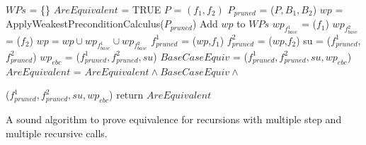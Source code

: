 \begin{algorithm}
\begin{minipage}{\linewidth}
\begin{algorithmic}[1]
	\State $WPs$ = \{\}
	\State $AreEquivalent$ = TRUE
	\State $P$ = $(f_1,f_2)$
	\State $P_{pruned}$ = ($P,B_1,B_2$)
	\State $wp$ = ApplyWeakestPreconditionCalculus($P_{pruned}$)
	\State Add $wp$ to $WPs$
	\EndFor
	\EndFor
	\State $wp_{f_{base}^1}$ = ($f_1$) 
	\State $wp_{f_{base}^2}$ = ($f_2$)
	\State $wp = wp\cup wp_{f_{base}^1} \cup wp_{f_{base}^2} $
	\State $f_{pruned}^1$ = ($wp$,$f_1$)
	\State $f_{pruned}^2$ = ($wp$,$f_2$)
	\State su = ($f_{pruned}^1$,$f_{pruned}^2$)
	\State $wp_{ebc}$ = ($f_{pruned}^1,f_{pruned}^2,su$)
	\State $BaseCaseEquiv$ = ($f_{pruned}^1,f_{pruned}^2,su,wp_{ebc}$) 
	\State $AreEquivalent$ = $AreEquivalent \wedge BaseCaseEquiv \wedge$
	
	
	($f_{pruned}^1,f_{pruned}^2,su,wp_{ebc}$) 
	\EndFor
	\State return $AreEquivalent$
	\EndFunction
\end{algorithmic}
\end{minipage}
\caption{A sound algorithm to prove equivalence for recursions with multiple step and multiple recursive calls.}
\label{alg:dvdwp}
\end{algorithm}


